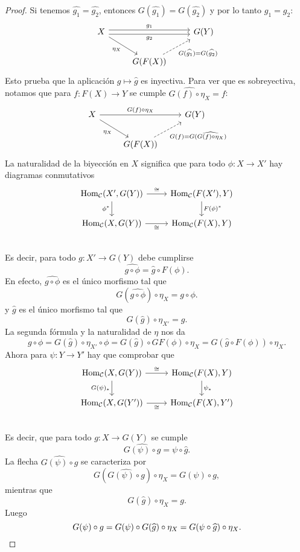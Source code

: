 \documentclass{article}
\numberwithin{equation}{section}
\theoremstyle{definition}
\begin{document}
\begin{proposicion}
\begin{proof}
    Si tenemos $\widehat{g_1} = \widehat{g_2}$, entonces
    $G (\widehat{g_1}) = G (\widehat{g_2})$ y por lo tanto $g_1 = g_2$:
    \[ \begin{tikzcd}
        X \ar[shift left=0.25em]{rr}{g_1}\ar[shift right=0.25em]{rr}[swap]{g_2}\ar{dr}[swap]{\eta_X} && G (Y) \\
        & G (F (X))\ar[dashed]{ur}[swap]{G (\widehat{g_1}) = G (\widehat{g_2})}
      \end{tikzcd} \]
    Esto prueba que la aplicación $g\mapsto \widehat{g}$ es inyectiva. Para ver
    que es sobreyectiva, notamos que para $f\colon F (X)\to Y$ se cumple
    $\widehat{G(f)\circ \eta_X} = f$:
    \[ \begin{tikzcd}
        X \ar{rr}{G(f)\circ \eta_X}\ar{dr}[swap]{\eta_X} && G (Y) \\
        & G (F (X))\ar[dashed]{ur}[swap]{G (f) = G (\widehat{G(f)\circ \eta_X})}
      \end{tikzcd} \]
    La naturalidad de la biyección en $X$ significa que para todo
    $\phi\colon X\to X'$ hay diagramas conmutativos
    \[ \begin{tikzcd}
        \Hom_\vcateg{C} (X', G (Y))\ar{r}{\isom}\ar{d}[swap]{\phi^*} & \Hom_\vcateg{C} (F (X'), Y)\ar{d}{F (\phi)^*} \\
        \Hom_\vcateg{C} (X, G (Y))\ar{r}[swap]{\isom} & \Hom_\vcateg{C} (F (X), Y) \\
      \end{tikzcd} \]
    Es decir, para todo $g\colon X'\to G (Y)$ debe cumplirse
    $$\widehat{g\circ\phi} = \widehat{g}\circ F (\phi).$$
    En efecto, $\widehat{g\circ\phi}$ es el único morfismo tal que
    $$G (\widehat{g\circ\phi})\circ \eta_X = g\circ\phi.$$
    y $\widehat{g}$ es el único morfismo tal que
    $$G (\widehat{g})\circ \eta_{X'} = g.$$
    La segunda fórmula y la naturalidad de $\eta$ nos da
    \[ g\circ \phi =
       G (\widehat{g})\circ \eta_{X'}\circ \phi =
       G (\widehat{g})\circ GF (\phi)\circ \eta_X =
       G (\widehat{g}\circ F (\phi))\circ \eta_X. \]
     Ahora para $\psi\colon Y\to Y'$ hay que comprobar que
     \[ \begin{tikzcd}
         \Hom_\vcateg{C} (X, G (Y))\ar{r}{\isom}\ar{d}[swap]{G (\psi)_*} & \Hom_\vcateg{C} (F (X), Y)\ar{d}{\psi_*} \\
         \Hom_\vcateg{C} (X, G (Y'))\ar{r}[swap]{\isom} & \Hom_\vcateg{C} (F (X), Y') \\
       \end{tikzcd} \]
     Es decir, que para todo $g\colon X\to G (Y)$ se cumple
     $$\widehat{G (\psi)\circ g} = \psi\circ \widehat{g}.$$
     La flecha $\widehat{G (\psi)\circ g}$ se caracteriza por
     $$G (\widehat{G (\psi)\circ g})\circ \eta_X = G (\psi)\circ g,$$
     mientras que
     $$G (\widehat{g})\circ \eta_X = g.$$
     Luego
     \[ G (\psi)\circ g =
        G (\psi)\circ G (\widehat{g})\circ \eta_X =
        G (\psi\circ \widehat{g})\circ \eta_X. \qedhere \]
  \end{proof}
\end{proposicion}
\end{document}
